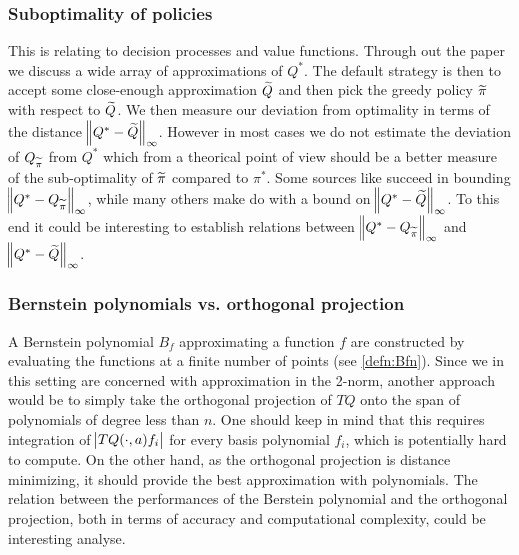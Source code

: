 \subsubsection{Suboptimality of policies}
This is relating to decision processes and value functions.
Through out the paper we discuss a wide array of
approximations of $Q^*$.
The default strategy is then to accept some close-enough approximation $\widetilde{Q}$
and then pick the greedy policy $\widetilde{\pi}$ with respect to $\widetilde{Q}$.
We then measure our deviation from optimality in terms of the distance
$\norm{Q^* - \widetilde{Q}}_\infty$.
However in most cases we do not estimate the deviation of
$Q_{\widetilde{\pi}}$ from $Q^*$ which from a theorical point of view should be
a better measure of the sub-optimality of $\widetilde{\pi}$ compared to $\pi^*$.
Some sources like  succeed in bounding
$\norm{Q^* - Q_{\widetilde{\pi}}}_\infty$,
while many others make do with a bound on $\norm{Q^* - \widetilde{Q}}_\infty$.
To this end it could be interesting to establish relations
between $\norm{Q^* - Q_{\widetilde{\pi}}}_\infty$ and $\norm{Q^* - \widetilde{Q}}_\infty$.

\subsubsection{Bernstein polynomials vs. orthogonal projection}
A Bernstein polynomial $B_f$ approximating a function $f$
are constructed by evaluating the
functions at a finite number of points (see \cref{defn:Bfn}).
Since we in this setting are concerned with approximation in the 2-norm,
another approach would be to simply take the orthogonal projection of
$TQ$ onto the span of polynomials of degree less than $n$.
One should keep in mind that this requires integration of
$\abs{TQ(\cdot, a) f_i}$ for every basis polynomial $f_i$,
which is potentially hard to compute.
On the other hand, as the orthogonal projection is distance minimizing,
it should provide the best approximation with polynomials.
The relation between the performances of the Berstein polynomial
and the orthogonal projection, both in terms of accuracy and 
computational complexity, could be interesting analyse.


